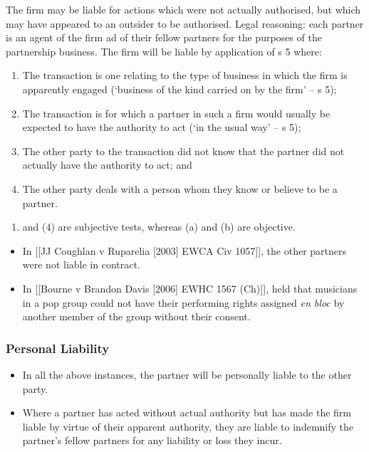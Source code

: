 \documentclass[
]{article}
\providecommand{\tightlist}{%
  \setlength{\itemsep}{0pt}\setlength{\parskip}{0pt}}
\begin{document}
The firm may be liable for actions which were not actually authorised,
but which may have appeared to an outsider to be authorised. Legal
reasoning: each partner is an agent of the firm ad of their fellow
partners for the purposes of the partnership business. The firm will be
liable by application of s 5 where:

\begin{enumerate}
\def\labelenumi{\arabic{enumi}.}
\tightlist
\item
  The transaction is one relating to the type of business in which the
  firm is apparently engaged (`business of the kind carried on by the
  firm' -- s 5);
\item
  The transaction is for which a partner in such a firm would usually be
  expected to have the authority to act (`in the usual way' -- s 5);
\item
  The other party to the transaction did not know that the partner did
  not actually have the authority to act; and
\item
  The other party deals with a person whom they know or believe to be a
  partner.
\end{enumerate}

\begin{enumerate}
\def\labelenumi{(\arabic{enumi})}
\setcounter{enumi}{2}
\tightlist
\item
  and (4) are subjective tests, whereas (a) and (b) are objective.
\end{enumerate}

\begin{itemize}
\tightlist
\item
  In {[}{[}JJ Coughlan v Ruparelia {[}2003{]} EWCA Civ 1057{]}{]}, the
  other partners were not liable in contract.
\item
  In {[}{[}Bourne v Brandon Davis {[}2006{]} EWHC 1567 (Ch){]}{]}, held
  that musicians in a pop group could not have their performing rights
  assigned \emph{en bloc} by another member of the group without their
  consent.
\end{itemize}

\hypertarget{personal-liability}{%
\subsubsection{Personal Liability}\label{personal-liability}}

\begin{itemize}
\tightlist
\item
  In all the above instances, the partner will be personally liable to
  the other party.
\item
  Where a partner has acted without actual authority but has made the
  firm liable by virtue of their apparent authority, they are liable to
  indemnify the partner's fellow partners for any liability or loss they
  incur.
\end{itemize}
\end{document}

